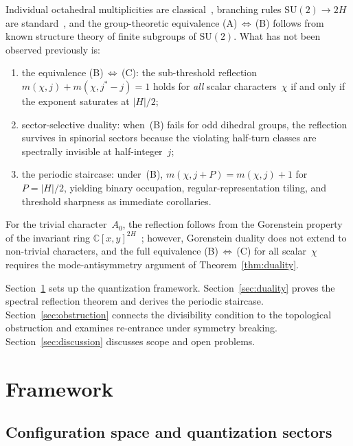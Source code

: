 \documentclass[12pt]{article}
\theoremstyle{definition}
\theoremstyle{remark}
\newcommand{\CC}{\mathbb{C}}
\newcommand{\SU}{\mathrm{SU}}
\begin{document}
Individual octahedral multiplicities are
classical~\cite{Hecht1960}, branching rules
$\SU(2) \to 2H$ are standard~\cite{BrockerTomDieck1985,AltmannHerzig1994},
and the group-theoretic equivalence
(A)$\,\Leftrightarrow\,$(B) follows from known
structure theory of finite subgroups of $\SU(2)$.
What has not been observed previously is:
\begin{enumerate}
\item[(i)] the equivalence
  (B)$\,\Leftrightarrow\,$(C): the sub-threshold
  reflection $m(\chi,j) + m(\chi,j^*{-}j) = 1$
  holds for \emph{all} scalar characters~$\chi$
  if and only if the exponent saturates at $|H|/2$;
\item[(ii)] sector-selective duality: when~(B) fails
  for odd dihedral groups, the reflection survives in
  spinorial sectors because the violating half-turn
  classes are spectrally invisible at half-integer~$j$;
\item[(iii)] the periodic staircase:
  under~(B), $m(\chi, j{+}P) = m(\chi, j) + 1$
  for $P = |H|/2$, yielding binary occupation,
  regular-representation tiling, and threshold sharpness
  as immediate corollaries.
\end{enumerate}
For the trivial character~$A_0$, the reflection
follows from the Gorenstein property of the invariant
ring $\CC[x,y]^{2H}$~\cite{Watanabe1974}; however,
Gorenstein duality does not extend to non-trivial
characters, and the full equivalence
(B)$\,\Leftrightarrow\,$(C) for all scalar~$\chi$
requires the mode-antisymmetry argument of
Theorem~\ref{thm:duality}.

Section~\ref{sec:framework} sets up the quantization framework.
Section~\ref{sec:duality} proves the spectral reflection theorem
and derives the periodic staircase.
Section~\ref{sec:obstruction} connects the divisibility condition
to the topological obstruction and examines re-entrance under
symmetry breaking.
Section~\ref{sec:discussion} discusses scope and open problems.

\section{Framework}
\label{sec:framework}

\subsection{Configuration space and quantization sectors}
\label{sec:config}
\end{document}
